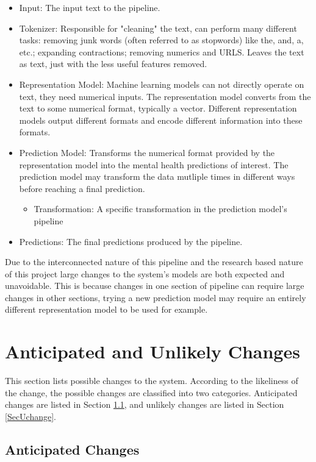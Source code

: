 \documentclass[12pt, titlepage]{article}
\begin{document}
\begin{itemize}
    \item Input: The input text to the pipeline.
    \item Tokenizer: Responsible for "cleaning" the text, can perform many different tasks: removing junk words (often referred to as stopwords) like the, and, a, etc.; expanding contractions; removing numerics and URLS. Leaves the text as text, just with the less useful features removed.
    \item Representation Model: Machine learning models can not directly operate on text, they need numerical inputs. The representation model converts from the text to some numerical format, typically a vector. Different representation models output different formats and encode different information into these formats.
    \item Prediction Model: Transforms the numerical format provided by the representation model into the mental health predictions of interest. The prediction model may transform the data mutliple times in different ways before reaching a final prediction.
    \begin{itemize}
        \item Transformation: A specific transformation in the prediction model's pipeline
    \end{itemize}
    \item Predictions: The final predictions produced by the pipeline.
\end{itemize}

Due to the interconnected nature of this pipeline and the research based nature of this project large changes to the system's models are both expected and unavoidable. This is because changes in one section of pipeline can require large changes in other sections, trying a new prediction model may require an entirely different representation model to be used for example.

\section{Anticipated and Unlikely Changes} \label{SecChange}

This section lists possible changes to the system. According to the likeliness
of the change, the possible changes are classified into two
categories. Anticipated changes are listed in Section \ref{SecAchange}, and
unlikely changes are listed in Section \ref{SecUchange}.

\subsection{Anticipated Changes} \label{SecAchange}
\end{document}
